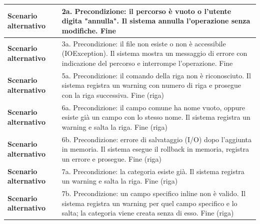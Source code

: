 \documentclass[12pt, a4paper, oneside]{report}
\begin{document}
\begin{tabularx}{\textwidth}{|l|X|}
    \textbf{Scenario alternativo} & 
    2a. Precondizione: il percorso è vuoto o l'utente digita "annulla".\newline
    Il sistema annulla l'operazione senza modifiche.\newline
    Fine \\ \hline

    \textbf{Scenario alternativo} & 
    3a. Precondizione: il file non esiste o non è accessibile (IOException).\newline
    Il sistema mostra un messaggio di errore con indicazione del percorso e interrompe l'operazione.\newline
    Fine \\ \hline

    \textbf{Scenario alternativo} & 
    5a. Precondizione: il comando della riga non è riconosciuto.\newline
    Il sistema registra un warning con numero di riga e prosegue con la riga successiva.\newline
    Fine (riga) \\ \hline

    \textbf{Scenario alternativo} & 
    6a. Precondizione: il campo comune ha nome vuoto, oppure esiste già un campo con lo stesso nome.\newline
    Il sistema registra un warning e salta la riga.\newline
    Fine (riga) \\ \hline

    \textbf{Scenario alternativo} & 
    6b. Precondizione: errore di salvataggio (I/O) dopo l'aggiunta in memoria.\newline
    Il sistema esegue il rollback in memoria, registra un errore e prosegue.\newline
    Fine (riga) \\ \hline

    \textbf{Scenario alternativo} & 
    7a. Precondizione: la categoria esiste già.\newline
    Il sistema registra un warning e salta la riga.\newline
    Fine (riga) \\ \hline

    \textbf{Scenario alternativo} & 
    7b. Precondizione: un campo specifico inline non è valido.\newline
    Il sistema registra un warning per quel campo specifico e lo salta; la categoria viene creata senza di esso.\newline
    Fine (riga) \\ \hline


\end{tabularx}
\end{document}
